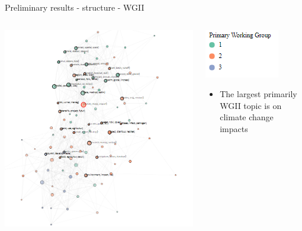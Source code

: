 \documentclass[9pt]{beamer}
\begin{document}
\begin{frame}{Preliminary results - structure - WGII}

\begin{columns}
	\begin{column}{0.65\linewidth}
		\begin{center}
			\vspace*{-0.1\linewidth}
			\includegraphics[width=1.1\linewidth]{../plots/network_wg_372_2.PNG}
		\end{center}
	\end{column}
	\begin{column}{0.35\linewidth}
		\includegraphics[width=0.4\linewidth]{../plots/network_wg_key.PNG}
		\begin{center}
			\begin{itemize}
				\item The largest primarily WGII topic is on climate change impacts
			\end{itemize}
		\end{center}
	\end{column}
\end{columns}

\end{frame}
\end{document}
